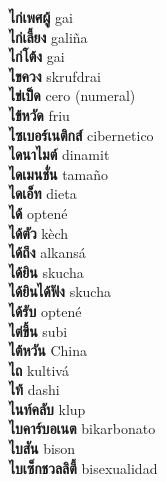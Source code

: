 \textbf{ ไก่เพศผู้  } gai \\
\textbf{ ไก่เลี้ยง  } galiña \\
\textbf{ ไก่โต้ง  } gai \\
\textbf{ ไขควง  } skrufdrai \\
\textbf{ ไข่เป็ด  } cero (numeral) \\
\textbf{ ไข้หวัด  } friu \\
\textbf{ ไซเบอร์เนติกส์  } cibernetico \\
\textbf{ ไดนาไมต์  } dinamit \\
\textbf{ ไดเมนชั่น  } tamaño \\
\textbf{ ไดเอ็ท  } dieta \\
\textbf{ ได้  } optené \\
\textbf{ ได้ตัว  } kèch \\
\textbf{ ได้ถึง  } alkansá \\
\textbf{ ได้ยิน  } skucha \\
\textbf{ ได้ยินได้ฟัง  } skucha \\
\textbf{ ได้รับ  } optené \\
\textbf{ ไต่ขึ้น  } subi \\
\textbf{ ไต้หวัน  } China \\
\textbf{ ไถ  } kultivá \\
\textbf{ ไท้  } dashi \\
\textbf{ ไนท์คลับ  } klup \\
\textbf{ ไบคาร์บอเนต  } bikarbonato \\
\textbf{ ไบสัน  } bison \\
\textbf{ ไบเซ็กชวลลิตี้  } bisexualidad \\
